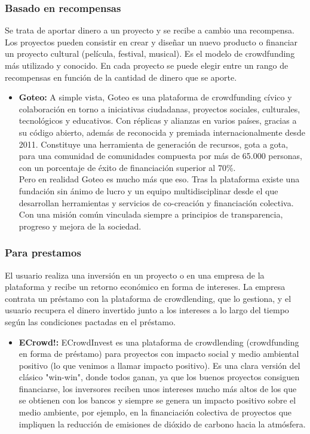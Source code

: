 \subsubsection{Basado en recompensas}
Se trata de aportar dinero a un proyecto y se recibe a cambio una recompensa. Los proyectos pueden consistir en crear y diseñar un nuevo producto o financiar un proyecto cultural (película, festival, musical). Es el modelo de crowdfunding más utilizado y conocido. En cada proyecto se puede elegir entre un rango de recompensas en función de la cantidad de dinero que se aporte.

\begin{itemize}
	\item \textbf{Goteo:} \smallbreak
	A simple vista, Goteo es una plataforma de crowdfunding cívico y colaboración en torno a iniciativas ciudadanas, proyectos sociales, culturales, tecnológicos y educativos. Con réplicas y alianzas en varios países, gracias a su código abierto, además de reconocida y premiada internacionalmente desde 2011. Constituye una herramienta de generación de recursos, gota a gota, para una comunidad de comunidades compuesta por más de 65.000 personas, con un porcentaje de éxito de financiación superior al 70\%.\\
	Pero en realidad Goteo es mucho más que eso. Tras la plataforma existe una fundación sin ánimo de lucro y un equipo multidisciplinar desde el que desarrollan herramientas y servicios de co-creación y financiación colectiva. Con una misión común vinculada siempre a principios de transparencia, progreso y mejora de la sociedad.
\end{itemize}

\subsubsection{Para prestamos}
El usuario realiza una inversión en un proyecto o en una empresa de la plataforma y recibe un retorno económico en forma de intereses. La empresa contrata un préstamo con la plataforma de crowdlending, que lo gestiona, y el usuario recupera el dinero invertido junto a los intereses a lo largo del tiempo según las condiciones pactadas en el préstamo.

\begin{itemize}
	\item \textbf{ECrowd!:} \smallbreak
	ECrowdInvest es una plataforma de crowdlending (crowdfunding en forma de préstamo) para proyectos con impacto social y medio ambiental positivo (lo que venimos a llamar impacto positivo). Es una clara versión del clásico "win-win", donde todos ganan, ya que los buenos proyectos consiguen financiarse, los inversores reciben unos intereses mucho más altos de los que se obtienen con los bancos y siempre se genera un impacto positivo sobre el medio ambiente, por ejemplo, en la financiación colectiva de proyectos que impliquen la reducción de emisiones de dióxido de carbono hacia la atmósfera.
\end{itemize}


